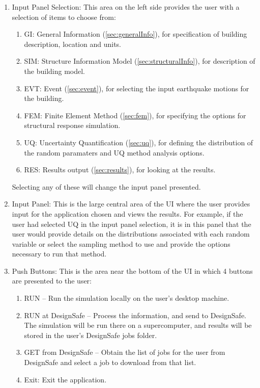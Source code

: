 \begin{enumerate}
\item Input Panel Selection: This area on the left side provides the
  user with a selection of items to choose from:
\begin{enumerate}
  \item GI: General Information (\ref{sec:generalInfo}), for specification of building
    description, location and units.
  \item SIM: Structure Information Model (\ref{sec:structuralInfo}), for description of the
    building model.
  \item EVT: Event (\ref{sec:event}), for selecting the input earthquake motions for the building.
  \item FEM: Finite Element Method (\ref{sec:fem}), for specifying the options for structural response simulation.
  \item UQ: Uncertainty Quantification (\ref{sec:uq}), for defining the distribution
    of the random paramaters and UQ method analysis options.


  \item RES: Results output (\ref{sec:results}), for looking at the results.
\end{enumerate}

Selecting any of these will change the input panel presented.

\item Input Panel: This is the large central area of the UI where the
  user provides input for the application chosen and views the
  results. For example, if the user had selected UQ in the input panel
  selection, it is in this panel that the user would provide details
  on the distributions associated with each random variable or select
  the sampling method to use and provide the options necessary to run
  that method.

\item Push Buttons: This is the area near the bottom of the UI in
  which 4 buttons are presented to the user:

\begin{enumerate}
\item RUN – Run the simulation locally on the user’s desktop machine.
\item RUN at DesignSafe – Process the information, and send to
  DesignSafe. The simulation will be run there on a supercomputer, and results
  will be stored in the user's DesignSafe jobs folder.
\item GET from DesignSafe – Obtain the list of
  jobs for the user from DesignSafe and select a job to download from that list.
\item Exit: Exit the application.
\end{enumerate}


\end{enumerate}
